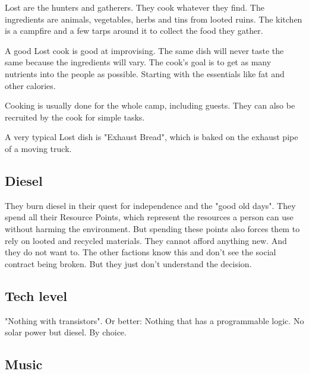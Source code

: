 Lost are the hunters and gatherers. They cook whatever they find. The ingredients are animals, vegetables, herbs and tins from looted ruins. The kitchen is a campfire and a few tarps around it to collect the food they gather.

A good Lost cook is good at improvising. The same dish will never taste the same because the ingredients will vary. The cook's goal is to get as many nutrients into the people as possible. Starting with the essentials like fat and other calories.

Cooking is usually done for the whole camp, including guests. They can also be recruited by the cook for simple tasks.

A very typical Lost dish is "Exhaust Bread", which is baked on the exhaust pipe of a moving truck.


\subsection{Diesel}

They burn diesel in their quest for independence and the "good old days". They spend all their Resource Points, which represent the resources a person can use without harming the environment. But spending these points also forces them to rely on looted and recycled materials. They cannot afford anything new. And they do not want to.
The other factions know this and don't see the social contract being broken. But they just don't understand the decision.

\subsection{Tech level}

"Nothing with transistors". Or better: Nothing that has a programmable logic. No solar power but diesel. By choice.

\subsection{Music}

